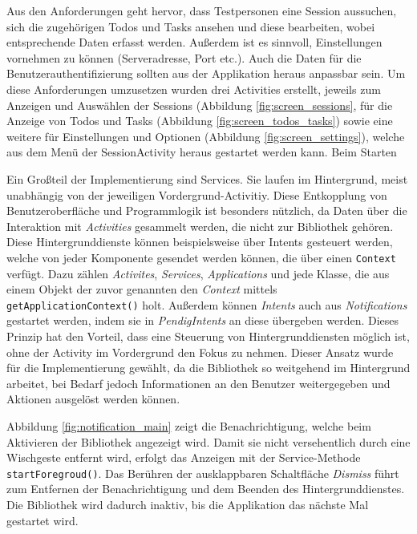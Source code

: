 Aus den Anforderungen geht hervor, dass Testpersonen eine Session aussuchen, sich die zugehörigen Todos und Tasks ansehen und diese bearbeiten, wobei entsprechende Daten erfasst werden.
Außerdem ist es sinnvoll, Einstellungen vornehmen zu können (Serveradresse, Port etc.). Auch die Daten für die Benutzerauthentifizierung sollten aus der Applikation heraus anpassbar sein.
Um diese Anforderungen umzusetzen wurden drei Activities erstellt, jeweils zum Anzeigen und Auswählen der Sessions (Abbildung \ref{fig:screen_sessions}, für die Anzeige von Todos und Tasks (Abbildung \ref{fig:screen_todos_tasks}) sowie eine weitere für Einstellungen und Optionen (Abbildung \ref{fig:screen_settings}), welche aus dem Menü der SessionActivity heraus gestartet werden kann.
Beim Starten


Ein Großteil der Implementierung sind Services.
Sie laufen im Hintergrund, meist unabhängig von der jeweiligen Vordergrund-Activitiy.
Diese Entkopplung von Benutzeroberfläche und Programmlogik ist besonders nützlich, da Daten über die Interaktion mit \emph{Activities} gesammelt werden, die nicht zur Bibliothek gehören.
Diese Hintergrunddienste können beispielsweise über Intents gesteuert werden, welche von jeder Komponente gesendet werden können, die über einen \texttt{Context} verfügt.
Dazu zählen \emph{Activites}, \emph{Services}, \emph{Applications} und jede Klasse, die aus einem Objekt der zuvor genannten den \emph{Context} mittels \texttt{getApplicationContext()} holt.
Außerdem können \emph{Intents} auch aus \emph{Notifications} gestartet werden, indem sie in \emph{PendigIntents} an diese übergeben werden.
Dieses Prinzip hat den Vorteil, dass eine Steuerung von Hintergrunddiensten möglich ist, ohne der Activity im Vordergrund den Fokus zu nehmen.
Dieser Ansatz wurde für die Implementierung gewählt, da die Bibliothek so weitgehend im Hintergrund arbeitet, bei Bedarf jedoch Informationen an den Benutzer weitergegeben und Aktionen ausgelöst werden können.

Abbildung \ref{fig:notification_main} zeigt die Benachrichtigung, welche beim Aktivieren der Bibliothek angezeigt wird. 
Damit sie nicht versehentlich durch eine Wischgeste entfernt wird, erfolgt das Anzeigen mit der Service-Methode \texttt{startForegroud()}.
Das Berühren der ausklappbaren Schaltfläche \emph{Dismiss} führt zum Entfernen der Benachrichtigung und dem Beenden des Hintergrunddienstes.
Die Bibliothek wird dadurch inaktiv, bis die Applikation das nächste Mal gestartet wird.

